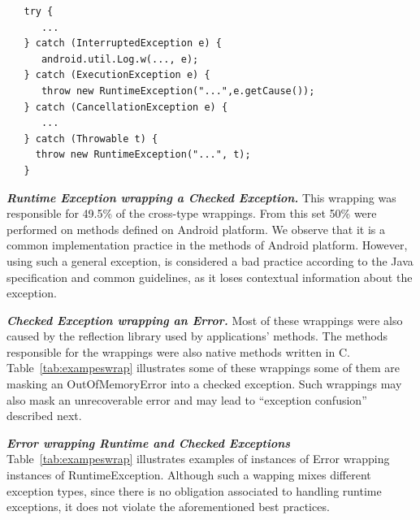 

{\footnotesize
\begin{verbatim}
   try {
      ...
   } catch (InterruptedException e) {
      android.util.Log.w(..., e);
   } catch (ExecutionException e) {
      throw new RuntimeException("...",e.getCause());
   } catch (CancellationException e) {
      ...
   } catch (Throwable t) {
     throw new RuntimeException("...", t);
   }
\end{verbatim}
}

\emph{\textbf{Runtime Exception wrapping a Checked Exception.}} 
This wrapping was responsible for 49.5\% of
the cross-type wrappings.  From this set 50\%  were performed on methods defined on Android platform. 
We observe that it is a common implementation practice in the methods of Android platform.
However, using such a general exception, is considered a bad practice
according to the Java specification and common guidelines, as it loses contextual information about the exception.


\emph{\textbf{Checked Exception wrapping an Error.}} Most of these wrappings
 were also caused by the reflection library used by applications' methods. The methods responsible for the wrappings
were also native methods written in C. Table~\ref{tab:exampeswrap} illustrates
some of these wrappings some of them are masking an OutOfMemoryError
into a checked exception. Such wrappings may also mask an unrecoverable error
and may lead to ``exception confusion'' described next.

\emph{\textbf{Error wrapping Runtime and Checked Exceptions}} Table~\ref{tab:exampeswrap}  illustrates
examples of instances of Error wrapping instances of
RuntimeException. 
Although such a wapping mixes different exception types,
since there is no obligation associated to handling runtime exceptions, it
does not violate the aforementioned best practices. 

